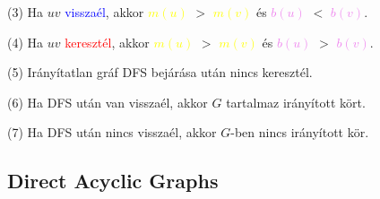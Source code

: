 \documentclass[../szamtud.tex]{subfiles}
\begin{document}

        (3) Ha $uv$ \textcolor{blue}{visszaél}, akkor \textcolor{yellow}{$m(u)$} $>$ \textcolor{yellow}{$m(v)$} és \textcolor{violet}{$b(u)$} $<$ \textcolor{violet}{$b(v)$}.


        (4) Ha $uv$ \textcolor{red}{keresztél}, akkor \textcolor{yellow}{$m(u)$} $>$ \textcolor{yellow}{$m(v)$} és \textcolor{violet}{$b(u)$} $>$ \textcolor{violet}{$b(v)$}.

        (5) Irányítatlan gráf DFS bejárása után nincs keresztél.


        (6) Ha DFS után van visszaél, akkor $G$ tartalmaz irányított kört.


        (7) Ha DFS után nincs visszaél, akkor $G$-ben nincs irányított kör.


    \subsection{Direct Acyclic Graphs}
\end{document}
